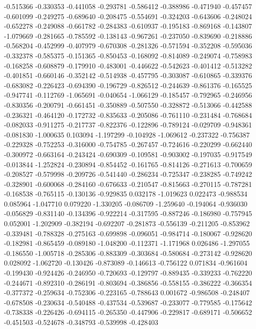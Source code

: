 -0.515366
-0.330353
-0.441058
-0.293781
-0.586412
-0.388986
-0.471940
-0.457457
-0.601099
-0.249275
-0.689640
-0.208475
-0.554691
-0.324203
-0.643606
-0.248024
-0.652278
-0.249088
-0.661782
-0.284383
-0.610937
-0.195183
-0.869168
-0.143807
-1.079669
-0.281665
-0.785592
-0.138143
-0.967261
-0.237050
-0.839690
-0.218886
-0.568204
-0.452999
-0.407979
-0.670308
-0.281326
-0.571594
-0.352208
-0.595036
-0.332378
-0.585375
-0.151365
-0.850453
-0.168092
-0.814089
-0.249074
-0.758983
-0.168258
-0.608879
-0.179910
-0.483001
-0.446622
-0.542623
-0.401412
-0.513282
-0.401851
-0.660146
-0.352142
-0.514938
-0.457795
-0.303087
-0.610865
-0.339376
-0.683082
-0.226423
-0.694390
-0.196729
-0.826512
-0.244639
-0.861376
-0.165525
-0.947741
-0.112769
-1.065691
-0.040654
-1.066129
-0.185457
-0.792965
-0.246956
-0.830356
-0.200791
-0.661451
-0.350889
-0.507550
-0.328872
-0.513066
-0.442588
-0.236321
-0.464120
-0.172732
-0.835633
-0.205086
-0.761110
-0.231484
-0.768684
-0.082033
-0.911275
-0.217737
-0.822376
-0.122896
-0.789124
-0.029709
-0.948361
-0.081830
-1.000635
0.103094
-1.197299
-0.104928
-1.069612
-0.237322
-0.756387
-0.229328
-0.752253
-0.316000
-0.754785
-0.267457
-0.724616
-0.220299
-0.662440
-0.300972
-0.663164
-0.243424
-0.690309
-0.109581
-0.903002
-0.197035
-0.917549
-0.013844
-1.252824
-0.230894
-0.854452
-0.161765
-0.814126
-0.271613
-0.700659
-0.208527
-0.579998
-0.209726
-0.541440
-0.286234
-0.725347
-0.238285
-0.749242
-0.328901
-0.600068
-0.284160
-0.676633
-0.210547
-0.815663
-0.270115
-0.787281
-0.168538
-0.765115
-0.130136
-0.929835
0.032178
-1.019623
0.022473
-0.988534
0.085964
-1.047710
0.079220
-1.330205
-0.086709
-1.259640
-0.194064
-0.936030
-0.056829
-0.831140
-0.134396
-0.922214
-0.317595
-0.887246
-0.186980
-0.757945
0.052001
-1.202909
-0.382194
-0.692207
-0.281873
-0.556139
-0.211205
-0.853962
-0.339481
-0.788328
-0.275163
-0.699898
-0.096051
-0.984714
-0.180067
-0.928620
-0.182981
-0.865459
-0.089180
-1.048200
-0.112371
-1.171968
0.026486
-1.297055
-0.186550
-1.005718
-0.285306
-0.883309
-0.303684
-0.580684
-0.273142
-0.928620
0.028092
-1.062720
-0.130426
-0.873089
-0.146613
-0.756122
0.071834
-0.961604
-0.199430
-0.924426
-0.246950
-0.720693
-0.129797
-0.889435
-0.339233
-0.762220
-0.244671
-0.892310
-0.286191
-0.803694
-0.386856
-0.558155
-0.386222
-0.366354
-0.377372
-0.259634
-0.752306
-0.223165
-0.788643
0.001672
-0.986508
-0.248407
-0.678508
-0.230634
-0.540488
-0.437534
-0.539687
-0.233077
-0.779585
-0.175642
-0.738338
-0.226426
-0.694115
-0.265350
-0.447906
-0.229817
-0.689171
-0.506652
-0.451503
-0.524678
-0.348793
-0.539998
-0.428403
